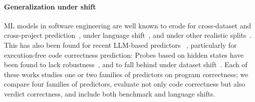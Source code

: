 

\paragraph{Generalization under shift}
ML models in software engineering are well known to erode for cross-dataset and cross-project prediction~\cite{zimmermann2009cpdp,hosseini2019cpdp}, under language shift~\cite{he2026codecircuit,huang2025pttrust},
and under other realistic splits~\cite{ding2025primevul}.
This has also been found for recent LLM-based predictors ~\cite{OrgadTGRSKB25,Kramar2026Probes,Srey2026Factorised}, particularly for 
execution-free code correctness prediction:  Probes based on hidden states have been found to lack robustness~\cite{ribeiro2026robustness}, and to fall behind under dataset shift~\cite{gros2025localized}.
Each of these works studies one or two families of predictors on program correctness; we compare four families of predictors, evaluate not only code correctness but also verdict correctness, and include both benchmark and language shifts.


